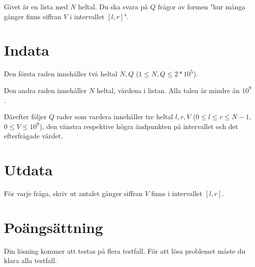 Givet är en lista med $N$ heltal. Du ska svara på $Q$ frågor av formen "hur många gånger finns
siffran $V$ i intervallet $[l,r]$".

\section*{Indata}
Den första raden innehåller två heltal $N,Q$ ($1 \leq N,Q \leq 2*10^5$).

Den andra raden innehåller $N$ heltal, värdena i listan. Alla talen är mindre än $10^9$.

Därefter följer $Q$ rader som vardera innehåller tre heltal $l, r, V$ ($0 \leq l \leq r \leq N-1$, $0 \leq V \leq 10^9$),
den vänstra respektive högra ändpunkten på intervallet och det efterfrågade värdet.

\section*{Utdata}
För varje fråga, skriv ut antalet gånger siffran $V$ finns i intervallet $[l,r]$.

\section*{Poängsättning}
Din lösning kommer att testas på flera testfall.
\noindent
För att lösa problemet måste du klara alla testfall.
